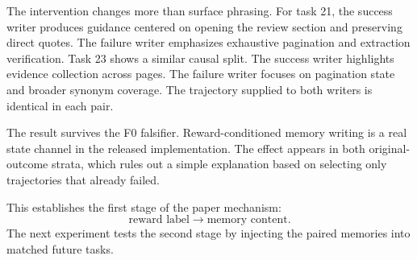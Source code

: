 The intervention changes more than surface phrasing. For task 21, the success writer produces guidance centered on opening the review section and preserving direct quotes. The failure writer emphasizes exhaustive pagination and extraction verification. Task 23 shows a similar causal split. The success writer highlights evidence collection across pages. The failure writer focuses on pagination state and broader synonym coverage. The trajectory supplied to both writers is identical in each pair.

The result survives the F0 falsifier. Reward-conditioned memory writing is a real state channel in the released implementation. The effect appears in both original-outcome strata, which rules out a simple explanation based on selecting only trajectories that already failed.

This establishes the first stage of the paper mechanism:
\begin{equation}
\text{reward label}\longrightarrow\text{memory content}.
\end{equation}
The next experiment tests the second stage by injecting the paired memories into matched future tasks.
